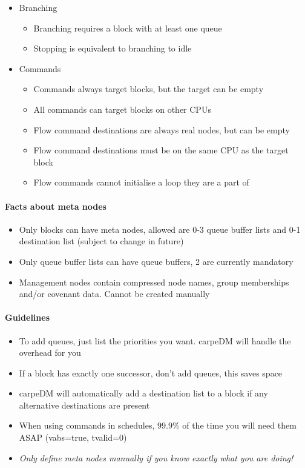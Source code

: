 \begin{itemize}
\begin{itemize}
\end{itemize}
  \item{Branching}
  \begin{itemize}
    \item{Branching requires a block with at least one queue}
    \item{Stopping is equivalent to branching to idle}
  \end{itemize}
  \item{Commands}
  \begin{itemize}
    \item{Commands always target blocks, but the target can be empty}
    \item{All commands can target blocks on other CPUs}
    \item{Flow command destinations are always real nodes, but can be empty}
    \item{Flow command destinations must be on the same CPU as the target block}
    \item{Flow commands cannot initialise a loop they are a part of}
\end{itemize}
\end{itemize}

\paragraph{Facts about meta nodes}
\begin{itemize}
  \item{Only blocks can have meta nodes, allowed are 0-3 queue buffer lists and 0-1 destination list (subject to change in future)}
  \item{Only queue buffer lists can have queue buffers, 2 are currently mandatory}
  \item{Management nodes contain compressed node names, group memberships and/or covenant data. Cannot be created manually}
\end{itemize}

\paragraph{Guidelines}
\begin{itemize}
  \item{To add queues, just list the priorities you want. carpeDM will handle the overhead for you}
  \item{If a block has exactly one successor, don't add queues, this saves space}
  \item{carpeDM will automatically add a destination list to a block if any alternative destinations are present}
  \item{When using commands in schedules, $99.9\%$ of the time you will need them ASAP (vabs=true, tvalid=0) }
  \item{\emph{Only define meta nodes manually if you know exactly what you are doing!}}
\end{itemize}

